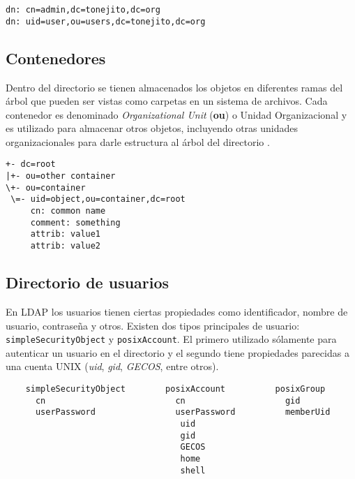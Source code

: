 {
\scriptsize
\linespread{1}
\begin{center}
  \texttt{dn: cn=admin,dc=tonejito,dc=org}
  \\
  \texttt{dn: uid=user,ou=users,dc=tonejito,dc=org}
\end{center}
}

  \subsection{Contenedores}

Dentro del directorio se tienen almacenados los objetos en diferentes ramas del \'{a}rbol que pueden ser vistas como carpetas en un sistema de archivos. Cada contenedor es denominado \textit{Organizational Unit} (\textbf{ou}) o Unidad Organizacional y es utilizado para almacenar otros objetos, incluyendo otras unidades organizacionales para darle estructura al \'{a}rbol del directorio \cite{_appendix_????}.

{
\scriptsize
\linespread{1}
\begin{verbatim}
+- dc=root
|+- ou=other container
\+- ou=container
 \=- uid=object,ou=container,dc=root
     cn: common name
     comment: something
     attrib: value1
     attrib: value2
\end{verbatim}
}

  \subsection {Directorio de usuarios}

En \textsc{LDAP}  los usuarios tienen ciertas propiedades como identificador, nombre de usuario, contrase\~{n}a y otros. Existen dos tipos principales de usuario: \texttt{simpleSecurityObject} y \texttt{posixAccount}. El primero utilizado s\'{o}lamente para autenticar un usuario en el directorio y el segundo tiene propiedades parecidas a una cuenta \textsc{UNIX} (\textit{uid}, \textit{gid}, \textit{GECOS}, entre otros).

{
\scriptsize
\linespread{1}
\begin{verbatim}
    simpleSecurityObject        posixAccount          posixGroup
      cn                          cn                    gid
      userPassword                userPassword          memberUid
                                   uid                
                                   gid                
                                   GECOS              
                                   home               
                                   shell              
\end{verbatim}
}

